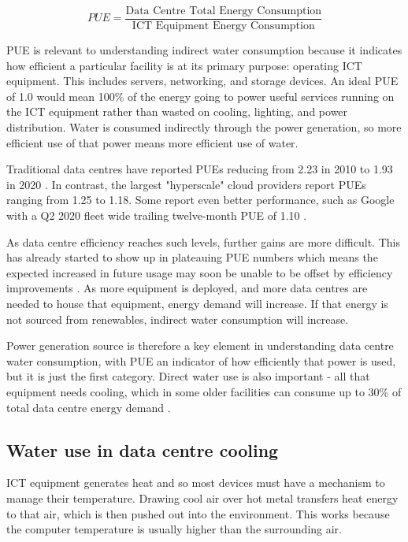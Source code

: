 \documentclass{article}
\begin{document}
\begin{equation}
    PUE = \frac{\textrm{Data Centre Total Energy Consumption}}{\textrm{ICT
    Equipment Energy Consumption}}
\end{equation}

PUE is relevant to understanding indirect water consumption because it
indicates how efficient a particular facility is at its primary purpose:
operating ICT equipment. This includes servers, networking, and storage
devices. An ideal PUE of 1.0 would mean 100\% of the energy going to power
useful services running on the ICT equipment rather than wasted on cooling,
lighting, and power distribution. Water is consumed indirectly through the
power generation, so more efficient use of that power means more efficient use
of water.

Traditional data centres have reported PUEs reducing from 2.23 in 2010 to 1.93
in 2020 \cite{masanet_recalibrating_2020}. In contrast, the largest
"hyperscale" cloud providers report PUEs ranging from 1.25 to 1.18. Some report
even better performance, such as Google with a Q2 2020 fleet wide trailing
twelve-month PUE of 1.10 \cite{google_efficiency_2020}.

As data centre efficiency reaches such levels, further gains are more
difficult. This has already started to show up in plateauing PUE numbers
\cite{lawrence_data_2020} which means the expected increased in future usage
may soon be unable to be offset by efficiency improvements
\cite{shehabi_data_2018}. As more equipment is deployed, and more data centres
are needed to house that equipment, energy demand will increase. If that energy
is not sourced from renewables, indirect water consumption will increase.

Power generation source is therefore a key element in understanding data centre
water consumption, with PUE an indicator of how efficiently that power is used,
but it is just the first category. Direct water use is also important - all
that equipment needs cooling, which in some older facilities can consume up to
30\% of total data centre energy demand \cite{iyengar_reducing_2010,
ebrahimi_review_2014,capozzoli_cooling_2015}.

\subsection*{Water use in data centre cooling}

ICT equipment generates heat and so most devices must have a mechanism to
manage their temperature. Drawing cool air over hot metal transfers heat energy
to that air, which is then pushed out into the environment. This works because
the computer temperature is usually higher than the surrounding air.
\end{document}
